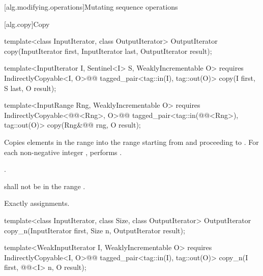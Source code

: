 [alg.modifying.operations]{Mutating sequence operations}

[alg.copy]{Copy}

%
\begin{removedblock}
\begin{itemdecl}
template<class InputIterator, class OutputIterator>
  OutputIterator copy(InputIterator first, InputIterator last,
                      OutputIterator result);
\end{itemdecl}
\end{removedblock}
\begin{addedblock}
\begin{itemdecl}
template<InputIterator I, Sentinel<I> S, WeaklyIncrementable O>
  requires IndirectlyCopyable<I, O>@\newtxt{()}@
  tagged_pair<tag::in(I), tag::out(O)>
    copy(I first, S last, O result);

template<InputRange Rng, WeaklyIncrementable O>
  requires IndirectlyCopyable<@@<Rng>, O>@\newtxt{()}@
  tagged_pair<tag::in(@@<Rng>), tag::out(O)>
    copy(Rng&@\newtxt{\&}@ rng, O result);
\end{itemdecl}
\end{addedblock}

\begin{itemdescr}
\pnum
\effects Copies elements in the range  into the range
 starting from  and
proceeding to . For each non-negative integer
, performs .

\pnum
\returns {}.

\pnum
\requires {} shall not be in the range .

\pnum
\complexity Exactly  assignments.
\end{itemdescr}

%
\begin{removedblock}
\begin{itemdecl}
template<class InputIterator, class Size, class OutputIterator>
  OutputIterator copy_n(InputIterator first, Size n,
                        OutputIterator result);
\end{itemdecl}
\end{removedblock}
\begin{addedblock}
\begin{itemdecl}
template<WeakInputIterator I, WeaklyIncrementable O>
  requires IndirectlyCopyable<I, O>@\newtxt{()}@
  tagged_pair<tag::in(I), tag::out(O)>
    copy_n(I first, @@<I> n, O result);
\end{itemdecl}
\end{addedblock}

